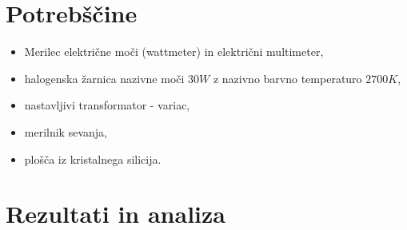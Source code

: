 \documentclass[10pt]{article}
\begin{document}
\section{Potrebščine}

\begin{itemize}
    \item Merilec električne moči (wattmeter) in električni multimeter,
    \item halogenska žarnica nazivne moči $30W$ z nazivno barvno temperaturo $2700K$,
    \item nastavljivi transformator - variac,
    \item merilnik sevanja,
    \item plošča iz kristalnega silicija.
\end{itemize}

\section{Rezultati in analiza}
\end{document}
